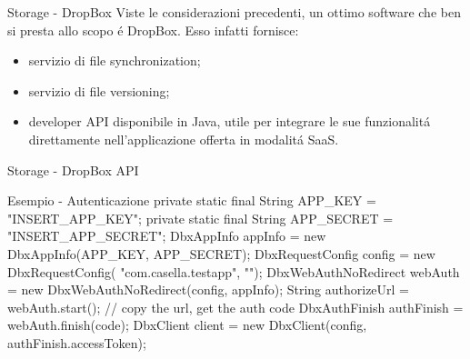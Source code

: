 \documentclass{beamer}
\begin{document}
\begin{frame}{Storage - DropBox}
Viste le considerazioni precedenti, un ottimo software che ben si presta allo scopo \'e DropBox. Esso infatti fornisce:
\begin{itemize}
\item servizio di file synchronization;
\item servizio di file versioning;
\item developer API disponibile in Java, utile per integrare le sue funzionalit\'a direttamente nell'applicazione offerta in modalit\'a SaaS.
\end{itemize}
\end{frame}

\begin{frame}{Storage - DropBox API}
\begin{exampleblock}{Esempio - Autenticazione}
{\small
private static final String APP\_KEY = "INSERT\_APP\_KEY";
\newline
private static final String APP\_SECRET = "INSERT\_APP\_SECRET";
\newline
DbxAppInfo appInfo = new DbxAppInfo(APP\_KEY, APP\_SECRET);
\newline
DbxRequestConfig config = new DbxRequestConfig( "com.casella.testapp", "");
\newline
DbxWebAuthNoRedirect webAuth = new DbxWebAuthNoRedirect(config, appInfo);
\newline
String authorizeUrl = webAuth.start();
\newline
// copy the url, get the auth code
\newline
DbxAuthFinish authFinish = webAuth.finish(code);
\newline
DbxClient client = new DbxClient(config, authFinish.accessToken);
}
\end{exampleblock}
\end{frame}
\end{document}
